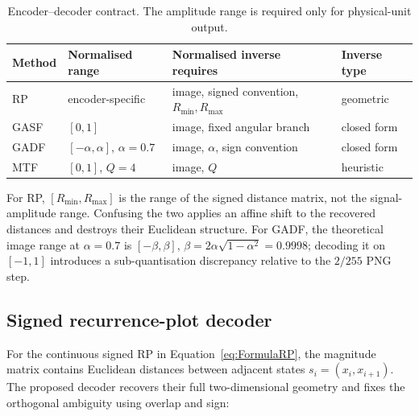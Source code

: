 \documentclass[10pt,a4paper,parskip=half-]{scrartcl}
\begin{document}
\begin{table}[!htbp]
\centering
\caption{Encoder--decoder contract. The amplitude range is required only for physical-unit output.}
\label{tab:decoder_contract}
\small
\begin{tabular}{@{}llll@{}}
\toprule
Method & Normalised range & Normalised inverse requires & Inverse type \\
\midrule
RP & encoder-specific & image, signed convention, \(R_{\min},R_{\max}\) & geometric \\
GASF & \([0,1]\) & image, fixed angular branch & closed form \\
GADF & \([-\alpha,\alpha]\), \(\alpha=0.7\) & image, \(\alpha\), sign convention & closed form \\
MTF & \([0,1]\), \(Q=4\) & image, \(Q\) & heuristic \\
\bottomrule
\end{tabular}
\end{table}

For RP, \([R_{\min},R_{\max}]\) is the range of the signed distance matrix, not the signal-amplitude range. Confusing the two applies an affine shift to the recovered distances and destroys their Euclidean structure. For GADF, the theoretical image range at \(\alpha=0.7\) is \([-\beta,\beta]\), \(\beta=2\alpha\sqrt{1-\alpha^2}=0.9998\); decoding it on \([-1,1]\) introduces a sub-quantisation discrepancy relative to the \(2/255\) PNG step.

\subsection{Signed recurrence-plot decoder}
\label{sec:rp_reconstruction_method}

For the continuous signed RP in Equation~\ref{eq:FormulaRP}, the magnitude matrix contains Euclidean distances between adjacent states \(s_i=(x_i,x_{i+1})\). The proposed decoder recovers their full two-dimensional geometry and fixes the orthogonal ambiguity using overlap and sign:
\end{document}
